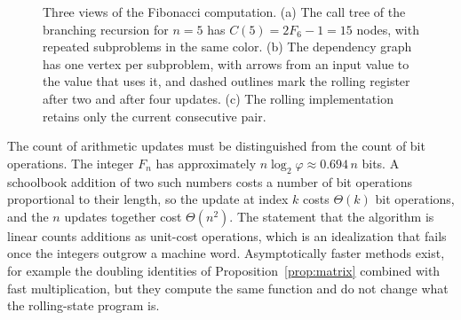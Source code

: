 \documentclass[11pt]{article}
\theoremstyle{definition}
\theoremstyle{remark}
\begin{document}
\begin{figure}[tbp]
{
}
\caption{Three views of the Fibonacci computation. (a) The call tree of the branching recursion for $n = 5$ has $C(5) = 2F_6 - 1 = 15$ nodes, with repeated subproblems in the same color. (b) The dependency graph has one vertex per subproblem, with arrows from an input value to the value that uses it, and dashed outlines mark the rolling register after two and after four updates. (c) The rolling implementation retains only the current consecutive pair.}
\label{fig:fibonacci}
\end{figure}

The count of arithmetic updates must be distinguished from the count of bit operations. The integer $F_n$ has approximately $n \log_2 \varphi \approx 0.694\,n$ bits. A schoolbook addition of two such numbers costs a number of bit operations proportional to their length, so the update at index $k$ costs $\Theta(k)$ bit operations, and the $n$ updates together cost $\Theta(n^2)$. The statement that the algorithm is linear counts additions as unit-cost operations, which is an idealization that fails once the integers outgrow a machine word. Asymptotically faster methods exist, for example the doubling identities of Proposition~\ref{prop:matrix} combined with fast multiplication, but they compute the same function and do not change what the rolling-state program is.
\end{document}
